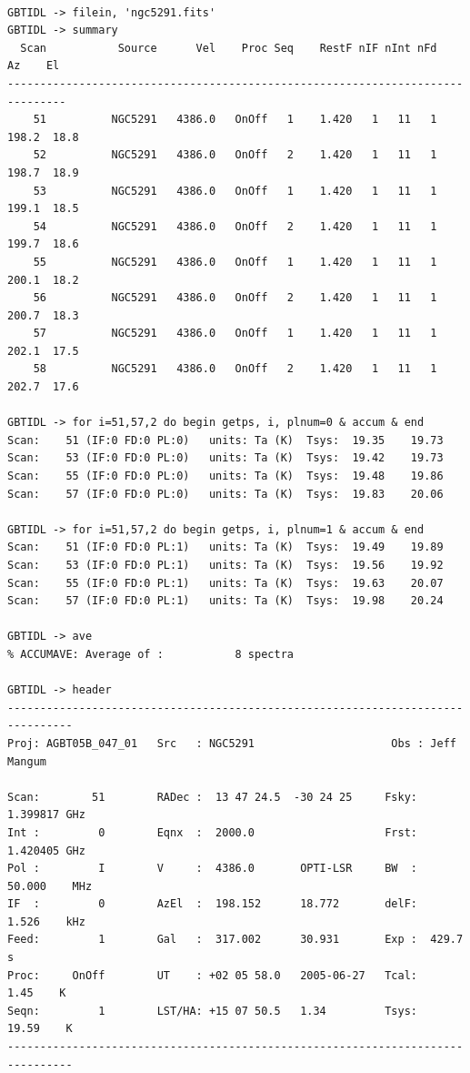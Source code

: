 \documentclass[12pt,a4paper]{article}
\begin{document}
\begin{lstlisting}

GBTIDL -> filein, 'ngc5291.fits' 
GBTIDL -> summary
  Scan           Source      Vel    Proc Seq    RestF nIF nInt nFd     Az    El
-------------------------------------------------------------------------------
    51          NGC5291   4386.0   OnOff   1    1.420   1   11   1  198.2  18.8
    52          NGC5291   4386.0   OnOff   2    1.420   1   11   1  198.7  18.9
    53          NGC5291   4386.0   OnOff   1    1.420   1   11   1  199.1  18.5
    54          NGC5291   4386.0   OnOff   2    1.420   1   11   1  199.7  18.6
    55          NGC5291   4386.0   OnOff   1    1.420   1   11   1  200.1  18.2
    56          NGC5291   4386.0   OnOff   2    1.420   1   11   1  200.7  18.3
    57          NGC5291   4386.0   OnOff   1    1.420   1   11   1  202.1  17.5
    58          NGC5291   4386.0   OnOff   2    1.420   1   11   1  202.7  17.6
    
GBTIDL -> for i=51,57,2 do begin getps, i, plnum=0 & accum & end  
Scan:    51 (IF:0 FD:0 PL:0)   units: Ta (K)  Tsys:  19.35    19.73
Scan:    53 (IF:0 FD:0 PL:0)   units: Ta (K)  Tsys:  19.42    19.73
Scan:    55 (IF:0 FD:0 PL:0)   units: Ta (K)  Tsys:  19.48    19.86
Scan:    57 (IF:0 FD:0 PL:0)   units: Ta (K)  Tsys:  19.83    20.06

GBTIDL -> for i=51,57,2 do begin getps, i, plnum=1 & accum & end  
Scan:    51 (IF:0 FD:0 PL:1)   units: Ta (K)  Tsys:  19.49    19.89
Scan:    53 (IF:0 FD:0 PL:1)   units: Ta (K)  Tsys:  19.56    19.92
Scan:    55 (IF:0 FD:0 PL:1)   units: Ta (K)  Tsys:  19.63    20.07
Scan:    57 (IF:0 FD:0 PL:1)   units: Ta (K)  Tsys:  19.98    20.24

GBTIDL -> ave
% ACCUMAVE: Average of :           8 spectra

GBTIDL -> header
--------------------------------------------------------------------------------
Proj: AGBT05B_047_01   Src   : NGC5291                     Obs : Jeff Mangum    

Scan:        51        RADec :  13 47 24.5  -30 24 25     Fsky:   1.399817 GHz
Int :         0        Eqnx  :  2000.0                    Frst:   1.420405 GHz
Pol :         I        V     :  4386.0       OPTI-LSR     BW  :  50.000    MHz
IF  :         0        AzEl  :  198.152      18.772       delF:   1.526    kHz
Feed:         1        Gal   :  317.002      30.931       Exp :  429.7     s
Proc:     OnOff        UT    : +02 05 58.0   2005-06-27   Tcal:    1.45    K
Seqn:         1        LST/HA: +15 07 50.5   1.34         Tsys:   19.59    K
--------------------------------------------------------------------------------


\end{lstlisting}
\end{document}
